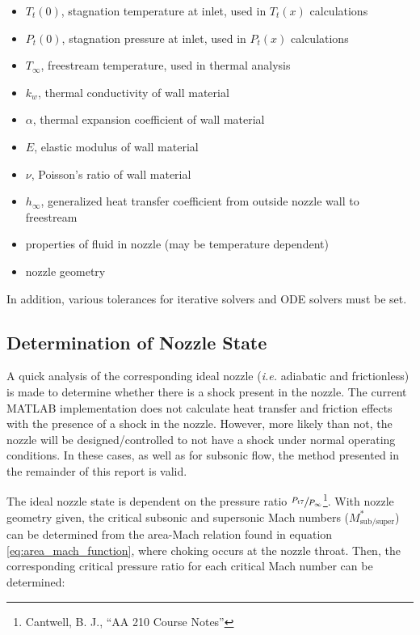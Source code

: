 \documentclass{article}
\begin{document}
\begin{itemize}
\item $T_t(0)$, stagnation temperature at inlet, used in $T_t(x)$ calculations
\item $P_t(0)$, stagnation pressure at inlet, used in $P_t(x)$ calculations
\item $T_{\infty}$, freestream temperature, used in thermal analysis
\item $k_w$, thermal conductivity of wall material
\item $\alpha$, thermal expansion coefficient of wall material
\item $E$, elastic modulus of wall material
\item $\nu$, Poisson's ratio of wall material
\item $h_{\infty}$, generalized heat transfer coefficient from outside nozzle wall to freestream
\item properties of fluid in nozzle (may be temperature dependent)
\item nozzle geometry
\end{itemize}

In addition, various tolerances for iterative solvers and ODE solvers must be set.

\subsection{Determination of Nozzle State}

A quick analysis of the corresponding ideal nozzle (\textit{i.e.} adiabatic and frictionless) is made to determine whether there is a shock present in the nozzle. The current MATLAB implementation does not calculate heat transfer and friction effects with the presence of a shock in the nozzle. However, more likely than not, the nozzle will be designed/controlled to not have a shock under normal operating conditions. In these cases, as well as for subsonic flow, the method presented in the remainder of this report is valid.

The ideal nozzle state is dependent on the pressure ratio $\sfrac{P_{t7}}{P_{\infty}}$\footnote{Cantwell, B. J., ``AA 210 Course Notes''}. With nozzle geometry given, the critical subsonic and supersonic Mach numbers ($M_{\textrm{sub/super}}^*$) can be determined from the area-Mach relation found in equation \ref{eq:area_mach_function}, where choking occurs at the nozzle throat. Then, the corresponding critical pressure ratio for each critical Mach number can be determined:
\end{document}
